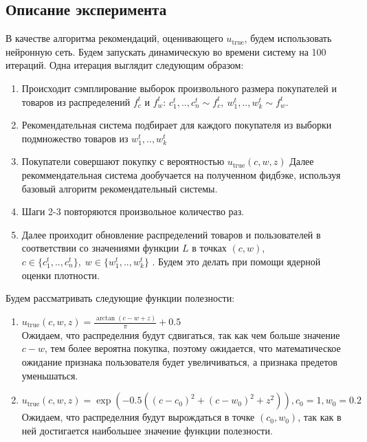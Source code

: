 \documentclass{article}
\begin{document}
\subsection{Описание эксперимента}
В качестве алгоритма рекомендаций, оценивающего $u_{\text{true}}$, будем использовать нейронную сеть.
Будем запускать динамическую во времени систему на 100 итераций. Одна итерация выглядит следующим образом:
\begin{enumerate}
\item Происходит сэмплирование выборок произвольного размера покупателей и товаров из распределений $f_c^t$ и $f_w^t$:
$c_1^t,..,c_n^t \sim f_c^t,\ w_1^t,..,w_k^t \sim f_w^t$.
\item Рекомендательная система подбирает для каждого покупателя из выборки подмножество товаров из $w_1^t,..,w_k^t$
\item Покупатели совершают покупку с вероятностью $u_{\text{true}}(c, w, z)$ Далее рекоммендательная система дообучается на полученном фидбэке, используя базовый алгоритм рекомендательный системы.
\item Шаги 2-3 повторяются произвольное количество раз.
\item Далее проиходит обновление распределений товаров и пользователей в соответствии со значениями функции $L$ в точках  $(c, w)$, $c \in \{ c_1^t,..,c_n^t \}, \; w \in \{ w_1^t,..,w_k^t \}$ . Будем это делать при помощи ядерной оценки плотности.
\end{enumerate}

Будем рассматривать следующие функции полезности:
\begin{enumerate}
\item $u_{\text{true}}(c, w, z) = \frac{\arctan(c - w + z)}{\pi} + 0.5$ \\
Ожидаем, что распределния будут сдвигаться, так как чем больше значение $c-w$, тем более вероятна покупка, поэтому ожидается, что математическое ожидание признака пользователя будет увеличиваться, а признака предетов уменьшаться.
\item$u_{\text{true}}(c, w, z) = \exp{(-0.5((c - c_0)^2 + (c - w_0)^2 + z^2))}, c_0 = 1, w_0 = 0.2 $\\
Ожидаем, что распределния будут вырождаться в точке $(c_0, w_0)$, так как в ней достигается наибольшее значение функции полезности.
\end{enumerate}
\end{document}
